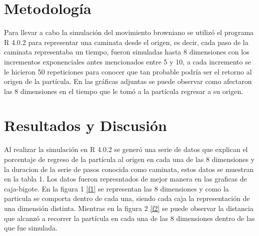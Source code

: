 \documentclass{article}
\begin{document}
\section{Metodolog\'ia}\label{met}

Para llevar a cabo la simulaci\'on del movimiento browniano se utiliz\'o el programa R 4.0.2 para representar una caminata desde el origen, es decir, cada paso de la caminata representaba un tiempo, fueron simuladas hasta 8 dimensiones con los incrementos exponenciales antes mencionados entre 5 y 10, a cada incremento se le hicieron 50 repeticiones para conocer que tan probable podr\'ia ser el retorno al origen de la part\'icula.
En las gr\'aficas adjuntas se puede observar como afectaron las 8 dimensiones en el tiempo que le tom\'o a la part\'icula regresar a su origen.
 
\section{Resultados y Discusi\'on}\label{res}

Al realizar la simulaci\'on en R 4.0.2 se gener\'o una serie de datos que explican el porcentaje de regreso de la part\'icula al origen en cada una de las 8 dimensiones y la duracion de la serie de pasos conocida como caminata, estos datos se muestran en la tabla 1.
Los datos fueron represntados de mejor manera en las graficas de caja-bigote. En la figura 1 \ref{f1} se representan las 8 dimensiones y como la particula se comporta dentro de cada una, siendo cada caja la representaci\'on de una dimensi\'on distinta. Mientras en la figura 2 \ref{f2} se puede observar la distancia que alcanz\'o a recorrer la part\'icula en cada una de las 8 dimensiones dentro de las que fue simulada.
 
\end{document}
